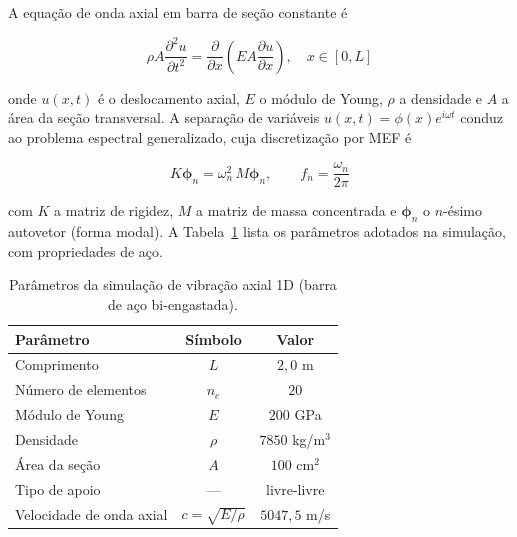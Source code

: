 A equação de onda axial em barra de seção constante é

\begin{equation}
    \rho A \frac{\partial^2 u}{\partial t^2} = \frac{\partial}{\partial x}\!\left( E A \frac{\partial u}{\partial x} \right), \quad x \in [0, L]
    \label{eq:val_vibracao_edp}
\end{equation}

\noindent onde $u(x,t)$ é o deslocamento axial, $E$ o módulo de Young, $\rho$ a densidade e $A$ a área da seção transversal. A separação de variáveis $u(x,t) = \phi(x) e^{i \omega t}$ conduz ao problema espectral generalizado, cuja discretização por MEF é

\begin{equation}
    K \boldsymbol{\phi}_n = \omega_n^2 \, M \boldsymbol{\phi}_n, \qquad f_n = \frac{\omega_n}{2\pi}
    \label{eq:val_vibracao_autovalor}
\end{equation}

\noindent com $K$ a matriz de rigidez, $M$ a matriz de massa concentrada e $\boldsymbol{\phi}_n$ o $n$-ésimo autovetor (forma modal). A Tabela~\ref{tab:val_vibracao_params} lista os parâmetros adotados na simulação, com propriedades de aço.

\begin{table}[htbp]
    \centering
    \caption{Parâmetros da simulação de vibração axial 1D (barra de aço bi-engastada).}
    \label{tab:val_vibracao_params}
    \begin{tabular}{lcc}
        \hline
        \textbf{Parâmetro} & \textbf{Símbolo} & \textbf{Valor} \\
        \hline
        Comprimento                  & $L$  & $2{,}0$ m          \\
        Número de elementos          & $n_e$ & $20$              \\
        Módulo de Young              & $E$  & $200$ GPa          \\
        Densidade                    & $\rho$ & $7850$ kg/m$^3$  \\
        Área da seção                & $A$  & $100$ cm$^{2}$     \\
        Tipo de apoio                & ---  & livre-livre       \\
        Velocidade de onda axial     & $c = \sqrt{E/\rho}$ & $5047{,}5$ m/s \\
        \hline
    \end{tabular}
\end{table}

